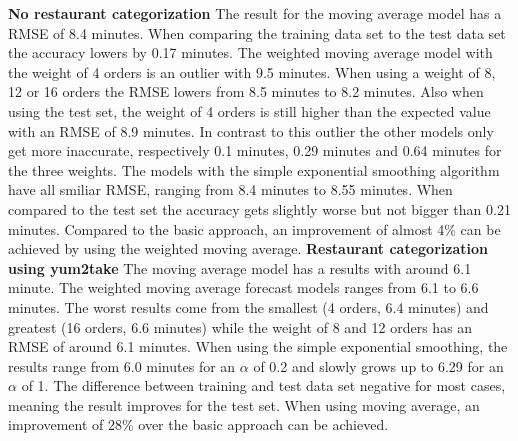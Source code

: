 \newline\newline\textbf{No restaurant categorization}\newline
The result for the moving average model has a RMSE of 8.4 minutes. When comparing the training data set to the test data set the accuracy lowers by 0.17 minutes. The weighted moving average model with the weight of 4 orders is an outlier with 9.5 minutes. When using a weight of 8, 12 or 16 orders the RMSE lowers from 8.5 minutes to 8.2 minutes. Also when using the test set, the weight of 4 orders is still higher than the expected value with an RMSE of 8.9 minutes. In contrast to this outlier the other models only get more inaccurate, respectively 0.1 minutes, 0.29 minutes and 0.64 minutes for the three weights. The models with the simple exponential smoothing algorithm have all smiliar RMSE, ranging from 8.4 minutes to 8.55 minutes. When compared to the test set the accuracy gets slightly worse but not bigger than 0.21 minutes.\newline
Compared to the basic approach, an improvement of almost 4\% can be achieved by using the weighted moving average.
\newline\newline\textbf{Restaurant categorization using yum2take}\newline
 The moving average model has a results with around 6.1 minute. The weighted moving average forecast models ranges from 6.1 to 6.6 minutes. The worst results come from the smallest (4 orders, 6.4 minutes) and greatest (16 orders, 6.6 minutes) while the weight of 8 and 12 orders has an RMSE of around 6.1 minutes. When using the simple exponential smoothing, the results range from 6.0 minutes for an $\alpha$ of 0.2 and slowly grows up to 6.29 for an $\alpha$ of 1. The difference between training and test data set negative for most cases, meaning the result improves for the test set.\newline
 When using moving average, an improvement of 28\% over the basic approach can be achieved.
